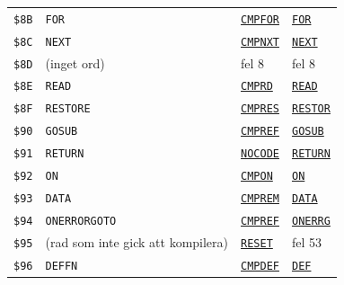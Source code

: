 \begin{small}
\begin{longtable}{@{}l l l l@{}}
\texttt{\$8B} & \texttt{FOR} & \hyperlink{l:CMPFOR}{\texttt{CMPFOR}} & \hyperlink{l:FOR}{\texttt{FOR}}\\
\texttt{\$8C} & \texttt{NEXT} & \hyperlink{l:CMPNXT}{\texttt{CMPNXT}} & \hyperlink{l:NEXT}{\texttt{NEXT}}\\
\texttt{\$8D} & (inget ord) & fel 8 & fel 8\\
\texttt{\$8E} & \texttt{READ} & \hyperlink{l:CMPRD}{\texttt{CMPRD}} & \hyperlink{l:READ}{\texttt{READ}}\\
\texttt{\$8F} & \texttt{RESTORE} & \hyperlink{l:CMPRES}{\texttt{CMPRES}} & \hyperlink{l:RESTOR}{\texttt{RESTOR}}\\
\texttt{\$90} & \texttt{GOSUB} & \hyperlink{l:CMPREF}{\texttt{CMPREF}} & \hyperlink{l:GOSUB}{\texttt{GOSUB}}\\
\texttt{\$91} & \texttt{RETURN} & \hyperlink{l:NOCODE}{\texttt{NOCODE}} & \hyperlink{l:RETURN}{\texttt{RETURN}}\\
\texttt{\$92} & \texttt{ON} & \hyperlink{l:CMPON}{\texttt{CMPON}} & \hyperlink{l:ON}{\texttt{ON}}\\
\texttt{\$93} & \texttt{DATA} & \hyperlink{l:CMPREM}{\texttt{CMPREM}} & \hyperlink{l:DATA}{\texttt{DATA}}\\
\texttt{\$94} & \texttt{ONERRORGOTO} & \hyperlink{l:CMPREF}{\texttt{CMPREF}} & \hyperlink{l:ONERRG}{\texttt{ONERRG}}\\
\texttt{\$95} & (rad som inte gick att kompilera) & \hyperlink{l:RESET}{\texttt{RESET}} & fel 53\\
\texttt{\$96} & \texttt{DEFFN} & \hyperlink{l:CMPDEF}{\texttt{CMPDEF}} & \hyperlink{l:DEF}{\texttt{DEF}}\\
\end{longtable}\end{small}
